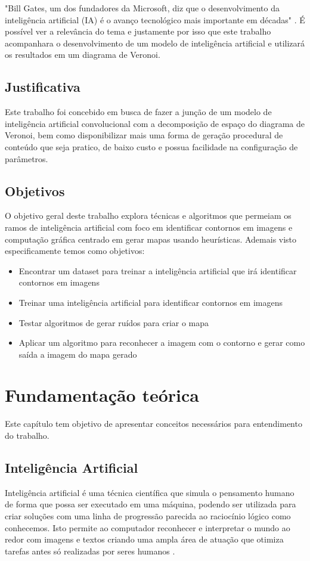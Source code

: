 \documentclass[
	12pt,				%
	openright,			%
	twoside,			%
	a4paper,			%
	english,			%
	french,				%
	spanish,			%
	brazil				%
	]{abntex2}
\begin{document}
"Bill Gates, um dos fundadores da Microsoft, diz que o desenvolvimento da inteligência artificial (IA) é o avanço tecnológico mais importante em décadas"\space
\cite{inteligencia_artificial_e_avanco_bbc}. É possível ver
a relevância do tema e justamente por isso que este trabalho acompanhara o desenvolvimento
de um modelo de inteligência artificial e utilizará os resultados em um diagrama de Veronoi.
\section{Justificativa}

Este trabalho foi concebido em busca de fazer a junção de um modelo de inteligência artificial convolucional com a decomposição de espaço do diagrama de Veronoi, bem como 
disponibilizar mais uma forma de geração procedural de conteúdo que seja pratico, de baixo custo e possua
facilidade na configuração de parâmetros.
\section{Objetivos}

O objetivo geral deste trabalho explora técnicas e algoritmos que permeiam os ramos de inteligência artificial com foco em identificar contornos em imagens e computação 
gráfica centrado em gerar mapas usando heurísticas.
Ademais visto especificamente temos como objetivos:

\begin{itemize}
	\item Encontrar um dataset para treinar a inteligência artificial que irá identificar contornos em imagens
	\item Treinar uma inteligência artificial para identificar contornos em imagens
	\item Testar algoritmos de gerar ruídos para criar o mapa
	\item Aplicar um algoritmo para reconhecer a imagem com o contorno e gerar como saída a imagem do mapa gerado
\end{itemize}


\chapter{Fundamentação teórica}
\label{sec:background}
	\label{sec:fund_teorica}

Este capítulo tem objetivo de apresentar conceitos necessários para entendimento do trabalho.

\section{Inteligência Artificial}
Inteligência artificial é uma técnica científica que simula o pensamento humano de forma que possa ser executado em uma máquina, podendo ser utilizada para criar soluções com uma linha de progressão parecida ao raciocínio lógico como conhecemos. Isto permite ao computador reconhecer e interpretar o mundo ao redor com imagens e textos criando uma ampla área de atuação que otimiza tarefas antes só realizadas por seres humanos \space\cite{ia_aliada_ou_inimiga}.
\end{document}
